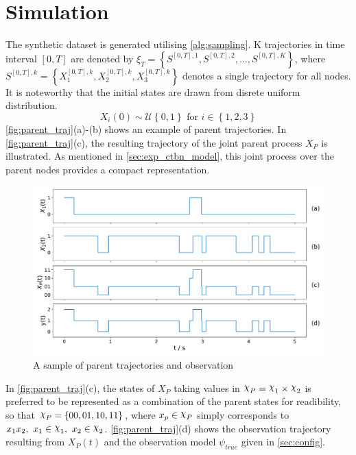 \section{Simulation}
\label{sec:simulation}
The synthetic dataset is generated utilising \cref{alg:sampling}. K trajectories in time interval $ [0, T] $ are denoted by $ \xi_T = \left\lbrace S^{[0,T], 1}, S^{[0,T], 2}, ..., S^{[0,T], K} \right\rbrace  $, where $ S^{[0,T],k} = \left\lbrace X_1^{[0,T],k} , X_2^{[0,T],k}, X_3^{[0,T],k}\right\rbrace $ denotes a single trajectory for all nodes. It is noteworthy that the initial states are drawn from disrete uniform distribution.
\begin{equation}
X_i(0) \sim \mathcal{U} \left\lbrace 0, 1\right\rbrace  \text{ for } i \in \left\lbrace 1,2,3\right\rbrace 
\end{equation}
\autoref{fig:parent_traj}(a)-(b) shows an example of parent trajectories. In \autoref{fig:parent_traj}(c), the resulting trajectory of the joint parent process $ X_P $ is illustrated. As mentioned in \cref{sec:exp_ctbn_model}, this joint process over the parent nodes provides a compact representation. 
\begin{figure}[H]
	\begin{center}
		\includegraphics[width=.90\textwidth]{figures/sim_example/parent_traj}
		\caption{A sample of parent trajectories and observation}
		\label{fig:parent_traj}
	\end{center}
\end{figure}
In \autoref{fig:parent_traj}(c), the states of $ X_P $ taking values in $ \rchi_P = \rchi_1 \times \rchi_2 $ is preferred to be represented as a combination of the parent states for readibility, so that $ \rchi_P = \left\lbrace 00, 01, 10, 11\right\rbrace  $, where $ x_p \in \rchi_P $ simply corresponds to $ x_1x_2,\ x_1\in \rchi_1,\  x_2\in \rchi_2 $. \autoref{fig:parent_traj}(d) shows the observation trajectory resulting from $ X_P(t) $ and the observation model $ \psi_{true} $ given in \cref{sec:config}. \\
